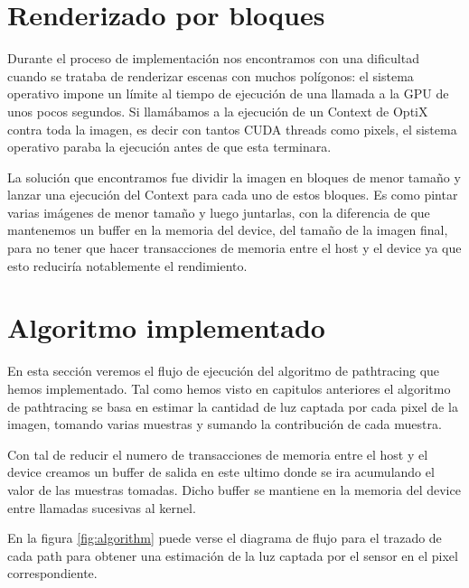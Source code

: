 \clearpage

\section{Renderizado por bloques}

Durante el proceso de implementación nos encontramos con una dificultad cuando se trataba de renderizar escenas con muchos polígonos: el sistema operativo impone un límite al tiempo de ejecución de una llamada a la GPU de unos pocos segundos. Si llamábamos a la ejecución de un Context de OptiX contra toda la imagen, es decir con tantos CUDA threads como pixels, el sistema operativo paraba la ejecución antes de que esta terminara.

\medskip

La solución que encontramos fue dividir la imagen en bloques de menor tamaño y lanzar una ejecución del Context para cada uno de estos bloques. Es como pintar varias imágenes de menor tamaño y luego juntarlas, con la diferencia de que mantenemos un buffer en la memoria del device, del tamaño de la imagen final, para no tener que hacer transacciones de memoria entre el host y el device ya que esto reduciría notablemente el rendimiento.

\clearpage

\section{Algoritmo implementado}

En esta sección veremos el flujo de ejecución del algoritmo de pathtracing que hemos implementado. Tal como hemos visto en capitulos anteriores el algoritmo de pathtracing se basa en estimar la cantidad de luz captada por cada pixel de la imagen, tomando varias muestras y sumando la contribución de cada muestra.

\medskip

Con tal de reducir el numero de transacciones de memoria entre el host y el device creamos un buffer de salida en este ultimo donde se ira acumulando el valor de las muestras tomadas. Dicho buffer se mantiene en la memoria del device entre llamadas sucesivas al kernel.

\medskip

En la figura \ref{fig:algorithm} puede verse el diagrama de flujo para el trazado de cada path para obtener una estimación de la luz captada por el sensor en el pixel correspondiente.

\medskip

